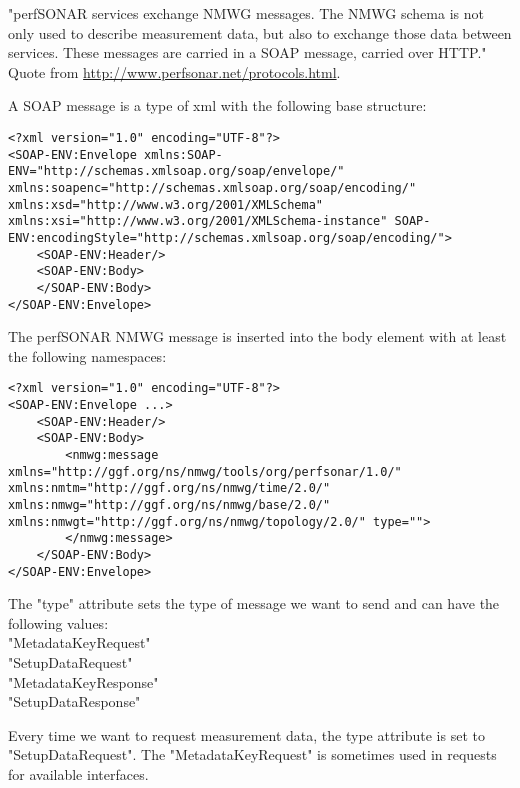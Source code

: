 \documentclass[a4paper,12pt,titlepage,hidelinks,fleqn]{article}
\begin{document}
\begin{flushleft}
"perfSONAR services exchange NMWG messages. The NMWG schema is not only used to describe measurement data, but also to exchange those data between services. These messages are carried in a SOAP message, carried over HTTP." \\
Quote from \href{http://www.perfsonar.net/protocols.html}{http://www.perfsonar.net/protocols.html}.
\begin{Block}
A SOAP message is a type of xml with the following base structure:
\begin{framed}
\begin{lstlisting}
<?xml version="1.0" encoding="UTF-8"?>
<SOAP-ENV:Envelope xmlns:SOAP-ENV="http://schemas.xmlsoap.org/soap/envelope/" xmlns:soapenc="http://schemas.xmlsoap.org/soap/encoding/" xmlns:xsd="http://www.w3.org/2001/XMLSchema" xmlns:xsi="http://www.w3.org/2001/XMLSchema-instance" SOAP-ENV:encodingStyle="http://schemas.xmlsoap.org/soap/encoding/">
	<SOAP-ENV:Header/>
	<SOAP-ENV:Body>
	</SOAP-ENV:Body>
</SOAP-ENV:Envelope>
\end{lstlisting}
\end{framed}
\end{Block}
\begin{Block}
The perfSONAR NMWG message is inserted into the body element with at least the following namespaces:
\begin{framed}
\begin{lstlisting}
<?xml version="1.0" encoding="UTF-8"?>
<SOAP-ENV:Envelope ...>
	<SOAP-ENV:Header/>
	<SOAP-ENV:Body>    
		<nmwg:message xmlns="http://ggf.org/ns/nmwg/tools/org/perfsonar/1.0/" xmlns:nmtm="http://ggf.org/ns/nmwg/time/2.0/" xmlns:nmwg="http://ggf.org/ns/nmwg/base/2.0/" xmlns:nmwgt="http://ggf.org/ns/nmwg/topology/2.0/" type="">
		</nmwg:message>
	</SOAP-ENV:Body>
</SOAP-ENV:Envelope>
\end{lstlisting}
\end{framed}
\end{Block}

The "type" attribute sets the type of message we want to send and can have the following values:\\
"MetadataKeyRequest"\\
"SetupDataRequest"\\
"MetadataKeyResponse"\\
"SetupDataResponse"\newline

Every time we want to request measurement data, the type attribute is set to "SetupDataRequest".
The "MetadataKeyRequest" is sometimes used in requests for available interfaces.\newline


\end{flushleft}
\end{document}
